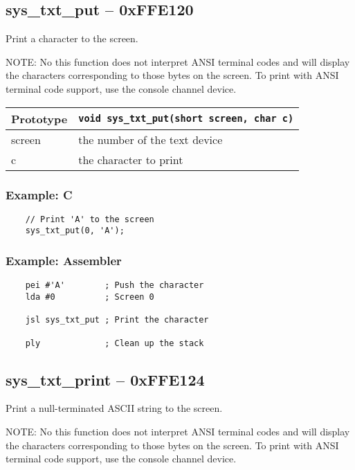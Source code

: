 \subsection*{sys\_txt\_put -- 0xFFE120}
Print a character to the screen.

NOTE: No this function does not interpret ANSI terminal codes and will display
the characters corresponding to those bytes on the screen. To print with ANSI
terminal code support, use the console channel device.

\bigskip

\begin{tabular}{|l||l|} \hline
Prototype & \lstinline!void sys_txt_put(short screen, char c)! \\ \hline
screen & the number of the text device \\ \hline
c & the character to print \\ \hline
\end{tabular}

\subsubsection*{Example: C}
\begin{lstlisting}
    // Print 'A' to the screen
    sys_txt_put(0, 'A');
\end{lstlisting}

\subsubsection*{Example: Assembler}
\begin{verbatim}
    pei #'A'        ; Push the character
    lda #0          ; Screen 0
    
    jsl sys_txt_put ; Print the character

    ply             ; Clean up the stack
\end{verbatim}

\subsection*{sys\_txt\_print -- 0xFFE124}
Print a null-terminated ASCII string to the screen.

NOTE: No this function does not interpret ANSI terminal codes and will display
the characters corresponding to those bytes on the screen. To print with ANSI
terminal code support, use the console channel device.

\bigskip


